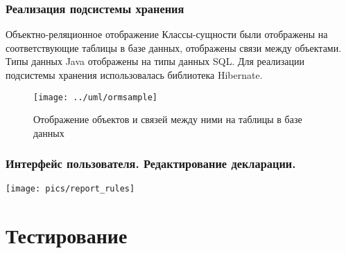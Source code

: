 \documentclass[xcolor=pdftex, dvipsnames, table]{beamer}
\begin{document}
\begin{frame}
  \frametitle{Реализация подсистемы хранения}
  \begin{block}{Объектно-реляционное отображение}
    Классы-сущности были отображены на соответствующие таблицы в базе данных, отображены связи между объектами. Типы данных Java отображены на типы данных SQL. Для реализации подсистемы хранения использовалась библиотека Hibernate.
  \end{block}

  \begin{figure}
    \texttt{[image: ../uml/ormsample]}
    \caption{Отображение объектов и связей между ними на таблицы в базе данных}
  \end{figure}
\end{frame}




\begin{frame}
  \frametitle{Интерфейс пользователя. Редактирование декларации.}
  \begin{center}
    \texttt{[image: pics/report\_rules]}
  \end{center}
\end{frame}


\section{Тестирование}
\end{document}

